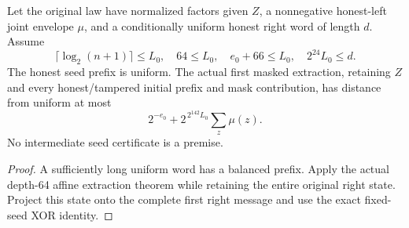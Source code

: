 \begin{theorem}
  \label{thm:lowerbounds-algebraic-affine-phase-one-initial}
  \leanok
  Let the original law have normalized factors given $Z$, a
  nonnegative honest-left joint envelope $\mu$, and a conditionally
  uniform honest right word of length $d$. Assume
  \[
    \lceil\log_2(n+1)\rceil\le L_0,\quad 64\le L_0,\quad
    e_0+66\le L_0,\quad 2^{24}L_0\le d.
  \]
  The honest seed prefix is uniform. The actual first masked
  extraction, retaining $Z$ and every honest/tampered initial prefix
  and mask contribution, has distance from uniform at most
  \[
    2^{-e_0}+2^{\,2^{142}L_0}\sum_z\mu(z).
  \]
  No intermediate seed certificate is a premise.
\end{theorem}
\begin{proof}
  \leanok
  A sufficiently long uniform word has a balanced prefix. Apply the
  actual depth-64 affine extraction theorem while retaining the
  entire original right state. Project this state onto the complete
  first right message and use the exact fixed-seed XOR identity.
\end{proof}

